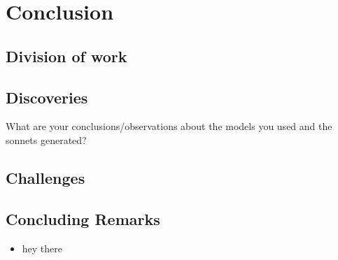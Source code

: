 \section{Conclusion}
\subsection{Division of work}
\subsection{Discoveries}
What are your conclusions/observations about the models you used and the sonnets generated?
\subsection{Challenges}
\subsection{Concluding Remarks}

\begin{itemize}

\item hey there

\end{itemize}


